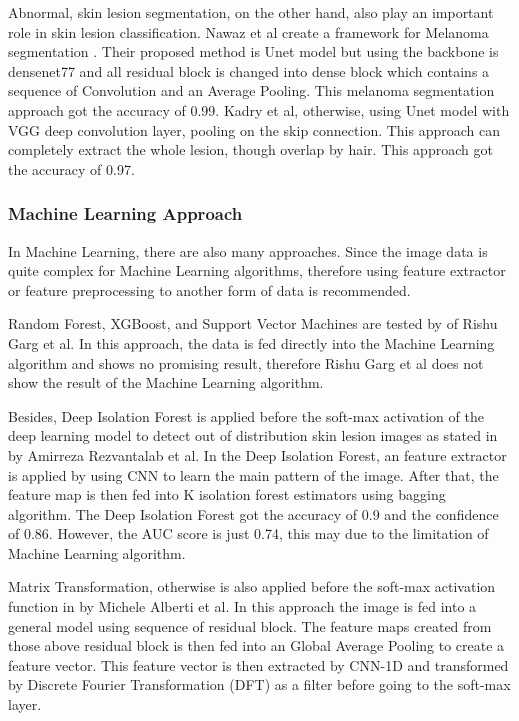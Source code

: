 \documentclass[sensors,article,submit,pdftex,moreauthors]{Definitions/mdpi}
\begin{document}
{		Abnormal, skin lesion segmentation, on the other hand, also play an important role in skin lesion classification. Nawaz et al create a framework for Melanoma segmentation \mbox{\cite{22750}}. Their proposed method is Unet model but using the backbone is densenet77 and all residual block is changed into dense block which contains a sequence of Convolution and an Average Pooling. This melanoma segmentation approach got the accuracy of 0.99. Kadry et al, otherwise, using Unet model with VGG deep convolution layer, pooling on the skip connection. This approach can completely extract the whole lesion, though overlap by hair. This approach got the accuracy of 0.97.
		
		\subsubsection{Machine Learning Approach}
		In Machine Learning, there are also many approaches. Since the image data is quite complex for Machine Learning algorithms, therefore using feature extractor or feature preprocessing to another form of data is recommended.
		
		Random Forest, XGBoost, and Support Vector Machines are tested by \mbox{\cite{03798}} of Rishu Garg et al. In this approach, the data is fed directly into the Machine Learning algorithm and shows no promising result, therefore Rishu Garg et al does not show the result of the Machine Learning algorithm. 
		
		Besides, Deep Isolation Forest is applied before the soft-max activation of the deep learning model to detect out of distribution skin lesion images as stated in \mbox{\cite{09365}} by Amirreza Rezvantalab et al. In the Deep Isolation Forest, an feature extractor is applied by using CNN to learn the main pattern of the image. After that, the feature map is then fed into K isolation forest estimators using bagging algorithm. The Deep Isolation Forest got the accuracy of 0.9 and the confidence of 0.86. However, the AUC score is just 0.74, this may due to the limitation of Machine Learning algorithm. 
		
		Matrix Transformation, otherwise is also applied before the soft-max activation function in \mbox{\cite{05045}} by Michele Alberti et al. In this approach the image is fed into a general model using sequence of residual block. The feature maps created from those above residual block is then fed into an Global Average Pooling to create a feature vector. This feature vector is then extracted by CNN-1D and transformed by Discrete Fourier Transformation (DFT) as a filter before going to the soft-max layer. 
	}
	
\end{document}
